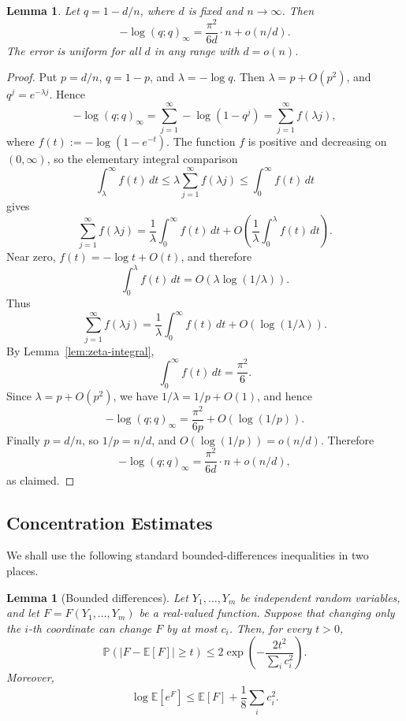 \documentclass[11pt]{article}
\newtheorem{lemma}[theorem]{Lemma}
\theoremstyle{definition}
\newcommand{\PP}{\mathbb{P}}
\newcommand{\EE}{\mathbb{E}}
\begin{document}
\begin{lemma}\label{lem:qpoch-asymp}
Let $q=1-d/n$, where $d$ is fixed and $n\to\infty$.  Then
\[
  -\log{(q;q)_\infty}
  =\frac{\pi^2}{6d}\cdot n+o(n/d).
\]
The error is uniform for all $d$ in any range with $d=o(n)$.
\end{lemma}

\begin{proof}
Put \(p=d/n\), \(q=1-p\), and \(\lambda=-\log q\). Then \(\lambda=p+O(p^2)\), and \(q^j=e^{-\lambda j}\). Hence
\[
  -\log(q;q)_\infty=\sum_{j=1}^{\infty}-\log(1-q^j)=\sum_{j=1}^{\infty}f(\lambda j),
\]
where \(f(t):=-\log(1-e^{-t})\). The function \(f\) is positive and decreasing on \((0,\infty)\), so the elementary integral comparison
\[
  \int_{\lambda}^{\infty}f(t)\,dt\le \lambda\sum_{j=1}^{\infty}f(\lambda j)\le \int_0^\infty f(t)\,dt
\]
gives
\[
  \sum_{j=1}^{\infty}f(\lambda j)=\frac1\lambda\int_0^\infty f(t)\,dt+O\left(\frac1\lambda\int_0^\lambda f(t)\,dt\right).
\]
Near zero, \(f(t)=-\log t+O(t)\), and therefore
\[
  \int_0^\lambda f(t)\,dt=O(\lambda\log(1/\lambda)).
\]
Thus
\[
  \sum_{j=1}^{\infty}f(\lambda j)=\frac1\lambda\int_0^\infty f(t)\,dt+O(\log(1/\lambda)).
\]
By Lemma~\ref{lem:zeta-integral},
\[
  \int_0^\infty f(t)\,dt=\frac{\pi^2}{6}.
\]
Since \(\lambda=p+O(p^2)\), we have \(1/\lambda=1/p+O(1)\), and hence
\[
  -\log(q;q)_\infty=\frac{\pi^2}{6p}+O(\log(1/p)).
\]
Finally \(p=d/n\), so \(1/p=n/d\), and \(O(\log(1/p))=o(n/d)\). Therefore
\[
  -\log(q;q)_\infty=\frac{\pi^2}{6d}\cdot n +o(n/d),
\]
as claimed.
\end{proof}


\subsection{Concentration Estimates}

We shall use the following standard bounded-differences inequalities in two places.

\begin{lemma}[Bounded differences]\label{lem:bounded-differences}
Let $Y_1,\ldots,Y_m$ be independent random variables, and let $F=F(Y_1,\ldots,Y_m)$ be a real-valued function.  Suppose that changing only the $i$-th coordinate can change $F$ by at most $c_i$.  Then, for every $t>0$,
\[
  \PP(|F-\EE \left[F\right]|\ge t)\le 2\exp\left(-\frac{2t^2}{\sum_i c_i^2}\right).
\]
Moreover,
\[
  \log \EE \left[e^F\right]\le \EE \left[F\right]+\frac18\sum_i c_i^2.
\]
\end{lemma}
\end{document}
